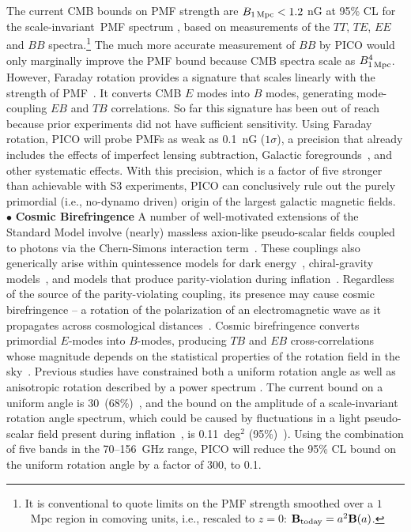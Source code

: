 \documentclass[PICOReport.tex]{subfiles}
\begin{document}
The current CMB bounds on PMF strength are $B_{\rm 1\,Mpc}<1.2$ nG at 95\% CL for the scale-invariant~PMF spectrum \cite{Zucca:2016iur}, based on measurements of the $TT$, $TE$, $EE$ and $BB$ spectra.\footnote{It is conventional to quote limits on the PMF strength smoothed over a $1$~Mpc region in comoving units,  i.e., rescaled to $z=0$: $\mathbf{B}_{\rm today} = a^2\mathbf{B}(a)$.} 
The much more accurate measurement of $BB$ by PICO would only marginally improve the PMF bound because CMB spectra scale as $B^4_{\rm 1\,Mpc}$. However, Faraday rotation provides a signature that scales linearly with the strength of PMF~\cite{Kosowsky:1996yc}. It converts CMB $E$ modes into $B$ modes, generating mode-coupling $EB$ and $TB$ correlations. So far this signature has been out of reach because prior experiments did not have sufficient sensitivity. Using Faraday rotation, PICO will probe PMFs as weak as 0.1~nG ($1\sigma$), a precision that already includes the effects of imperfect lensing subtraction, Galactic foregrounds~\cite{Oppermann:2011td,De:2013dra,Pogosian:2013dya}, and other systematic effects. With this precision, which is a factor of five stronger than achievable with S3 experiments, PICO can conclusively rule out the purely primordial (i.e., no-dynamo driven) origin of the largest galactic magnetic fields. \\
%
$\bullet$ {\bf Cosmic Birefringence} \hspace{0.1in}
A number of well-motivated extensions of the Standard Model involve (nearly) massless axion-like pseudo-scalar fields coupled to photons via the Chern-Simons interaction term~\citep{Freese:1990rb,Frieman:1995pm,Carroll:1998zi,Kaloper:2005aj}. These couplings also generically arise within quintessence models for dark energy~\citep{Carroll:1998zi}, chiral-gravity models~\citep{2008PhRvL.101n1101C}, and models that produce parity-violation during inflation~\cite{Gluscevic:2010vv}. Regardless of the source of the parity-violating coupling, its presence may cause cosmic birefringence -- a rotation of the polarization of an electromagnetic wave as it propagates across cosmological distances~\cite{Harari:1992ea,Carroll:1989vb,Carroll:1998zi}. Cosmic birefringence converts primordial $E$-modes into $B$-modes, producing $TB$ and $EB$ cross-correlations whose magnitude depends on the statistical properties of the rotation field in the sky~\cite{Kamionkowski:2008fp,Gluscevic:2009mm,Gluscevic:2012me}. Previous studies have constrained both a uniform rotation angle as well as anisotropic rotation described by a power spectrum \cite{Gluscevic:2012me}. The current bound on a uniform angle is 30\arcmin\ (68\%)~\cite{Planck2016_XLIX}, and the bound on the amplitude of a scale-invariant rotation angle spectrum, which could be caused by fluctuations in a light pseudo-scalar field present during inflation~\cite{Pospelov:2008gg}, is 0.11~deg$^2$ (95\%)~\citep{Array:2017rlf}). Using the combination of five bands in the 70--156~GHz range, PICO will reduce the 95\% CL bound on the uniform rotation angle by a factor of 300, to 0.1\arcmin.  
\end{document}
